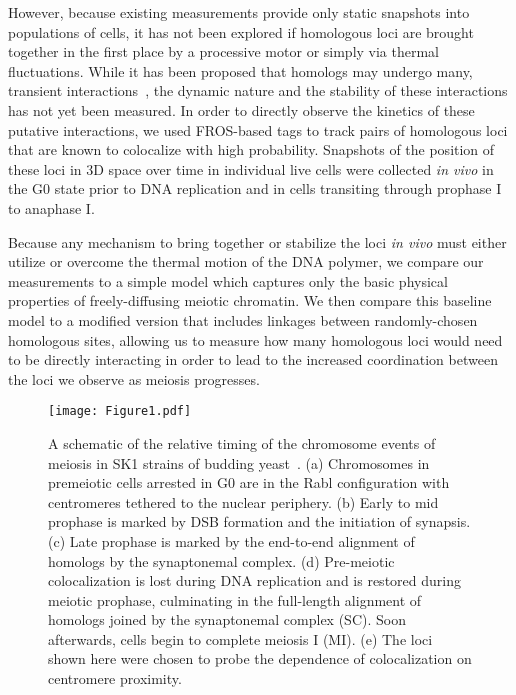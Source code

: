 \documentclass[9pt,twocolumn,twoside,lineno]{pnas-new}
\begin{document}
However, because existing measurements provide only static snapshots into populations of cells, it has not been explored if homologous loci are brought together in the first place by a processive motor or simply via thermal fluctuations. While it has been proposed that homologs may undergo many, transient interactions~\cite{weiner1993,weiner1994}, the dynamic nature and the stability of these interactions has not yet been measured.  In order to directly observe the kinetics of these putative interactions, we used FROS-based tags to track pairs of homologous loci that are known to colocalize with high probability. Snapshots of the position of these loci in 3D space over time in individual live cells were collected \textit{in vivo} in the G0 state prior to DNA replication and in cells transiting through prophase I to anaphase I.

Because any mechanism to bring together or stabilize the loci \textit{in vivo} must either utilize or overcome the thermal motion of the DNA polymer, we compare our measurements to a simple model which captures only the basic physical properties of freely-diffusing meiotic chromatin. We then compare this baseline model to a modified version that includes linkages between randomly-chosen homologous sites, allowing us to measure how many homologous loci would need to be directly interacting in order to lead to the increased coordination between the loci we observe as meiosis progresses.


\begin{figure}[t!]
    \centering
    \texttt{[image: Figure1.pdf]}
    \caption{A schematic of the relative timing of the chromosome events of meiosis in SK1 strains of budding yeast~\cite{padmore1991,weiner1994, cha2000,tesse2003,brar2009,borner2004,peoples2002}. (a) Chromosomes in premeiotic cells arrested in G0 are in the Rabl configuration with centromeres tethered to the nuclear periphery. (b) Early to mid prophase is marked by DSB formation and the initiation of synapsis. (c) Late prophase is marked by the end-to-end alignment of homologs by the synaptonemal complex. (d) Pre-meiotic colocalization is lost during DNA replication and is restored during meiotic prophase, culminating in the full-length alignment of homologs joined by the synaptonemal complex (SC). Soon afterwards, cells begin to complete meiosis I (MI). (e) The loci shown here were chosen to probe the dependence of colocalization on centromere proximity.
    }\label{fig:meiosis}
\end{figure}
\end{document}
